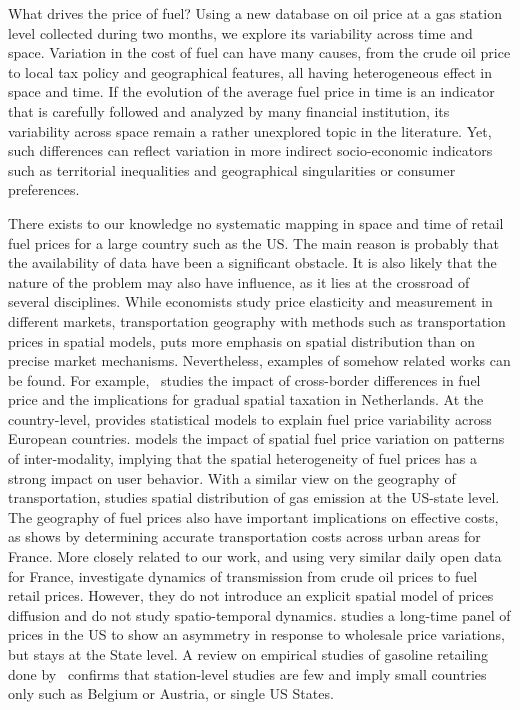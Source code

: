 \documentclass[3p,times,procedia]{elsarticle}
\begin{document}
What drives the price of fuel? Using a new database on oil price at a gas station level collected during two months, we explore its variability across time and space. Variation in the cost of fuel can have many causes, from the crude oil price to local tax policy and geographical features, all having heterogeneous effect in space and time. If the evolution of the average fuel price in time is an indicator that is carefully followed and analyzed by many financial institution, its variability across space remain a rather unexplored topic in the literature. Yet, such differences can reflect variation in more indirect socio-economic indicators such as territorial inequalities and geographical singularities or consumer preferences.

There exists to our knowledge no systematic mapping in space and time of retail fuel prices for a large country such as the US. The main reason is probably that the availability of data have been a significant obstacle. It is also likely that the nature of the problem may also have influence, as it lies at the crossroad of several disciplines. While economists study price elasticity and measurement in different markets, transportation geography with methods such as transportation prices in spatial models, puts more emphasis on spatial distribution than on precise market mechanisms. Nevertheless, examples of somehow related works can be found. For example,~\cite{rietveld2001spatial} studies the impact of cross-border differences in fuel price and the implications for gradual spatial taxation in Netherlands. At the country-level, \cite{rietveld2005fuel} provides statistical models to explain fuel price variability across European countries. \cite{macharis2010decision} models the impact of spatial fuel price variation on patterns of inter-modality, implying that the spatial heterogeneity of fuel prices has a strong impact on user behavior. With a similar view on the geography of transportation, \cite{gregg2009temporal} studies spatial distribution of gas emission at the US-state level. The geography of fuel prices also have important implications on effective costs, as shows \cite{combes2005transport} by determining accurate transportation costs across urban areas for France. More closely related to our work, and using very similar daily open data for France, \cite{gautier2015dynamics} investigate dynamics of transmission from crude oil prices to fuel retail prices. However, they do not introduce an explicit spatial model of prices diffusion and do not study spatio-temporal dynamics. \cite{deltas2008retail} studies a long-time panel of prices in the US to show an asymmetry in response to wholesale price variations, but stays at the State level. A review on empirical studies of gasoline retailing done by~\cite{eckert2013empirical} confirms that station-level studies are few and imply small countries only such as Belgium or Austria, or single US States.
\end{document}
